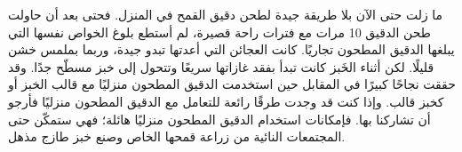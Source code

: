 ما زلت حتى الآن بلا طريقة جيدة لطحن دقيق القمح في المنزل. فحتى بعد أن حاولت طحن الدقيق \num{10} مرات مع فترات راحة قصيرة، لم أستطع بلوغ الخواص نفسها التي يبلغها الدقيق المطحون تجاريًا. كانت العجائن التي أعدتها تبدو جيدة، وربما بملمس خشن قليلًا. لكن أثناء الخَبز كانت تبدأ بفقد غازاتها سريعًا وتتحول إلى خبز مسطّح جدًا. وقد حققت نجاحًا كبيرًا في المقابل حين استخدمت الدقيق المطحون منزليًا مع قالب الخبز أو كخبز قالب. وإذا كنت قد وجدت طرقًا رائعة للتعامل مع الدقيق المطحون منزليًا فأرجو أن تشاركنا بها. فإمكانات استخدام الدقيق المطحون منزليًا هائلة؛ فهي ستمكّن حتى المجتمعات النائية من زراعة قمحها الخاص وصنع خبز طازج مذهل.
